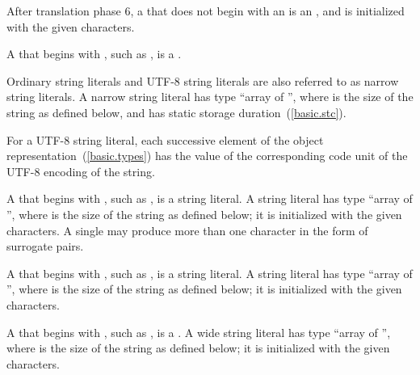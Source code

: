 \pnum
{}%
%
After translation phase 6, a  that does not begin with an  is an
, and is initialized with the given characters.

\pnum
{}%
A  that begins with ,
%
such as , is a .

\pnum
Ordinary string literals and UTF-8 string literals are
also referred to as narrow
string literals. A narrow string literal has type
%
``array of  '', where  is the size of
the string as defined below, and has static storage
duration~(\ref{basic.stc}).

\pnum
For a UTF-8 string literal, each successive element of the object
representation~(\ref{basic.types}) has the value of the corresponding
code unit of the UTF-8 encoding of the string.

\pnum
{}%
A  that begins with ,
%
such as , is
a  string literal. A  string literal has
type ``array of  '', where  is the
size of the string as defined below; it
is initialized with the given characters. A single  may
produce more than one  character in the form of
surrogate pairs.

\pnum
{}%
A  that begins with ,
%
such as , is
a  string literal. A  string literal has
type ``array of  '', where  is the
size of the string as defined below; it
is initialized with the given characters.

\pnum
{}%
A  that begins with ,
%
such as , is a .
%
%
%
%
A wide string literal has type ``array of  '', where  is the size of the string as defined below; it
is initialized with the given characters.

